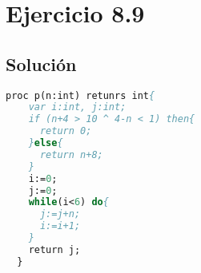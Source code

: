 \documentclass[11pt, a4paper, titlepage]{article}
\begin{document}
\section*{Ejercicio 8.9}
\subsection*{Solución}
\begin{lstlisting}[language=pascal]
  proc p(n:int) retunrs int{
    var i:int, j:int;
    if (n+4 > 10 ^ 4-n < 1) then{
      return 0;
    }else{
      return n+8;
    }
    i:=0;
    j:=0;
    while(i<6) do{
      j:=j+n;
      i:=i+1;
    }
    return j;
  }
\end{lstlisting}
\end{document}
